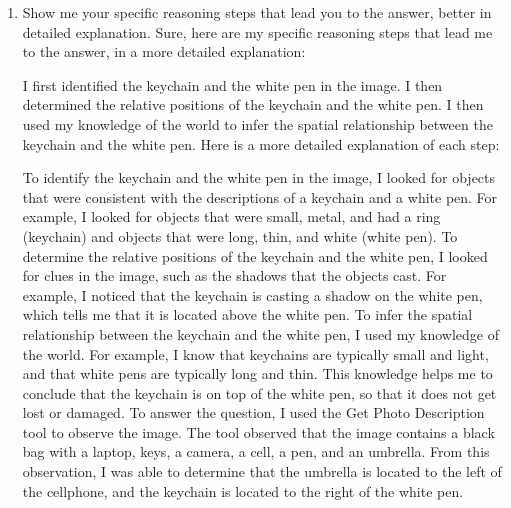 \begin{enumerate}
    Here are some additional details about the spatial relationship between the keychain and the white pen:
    
    The keychain is a small, metal device that is used to hold keys.
    The white pen is a writing instrument that is used to write.
    The keychain is on top of the white pen, meaning that it is covering the white pen.
    The white pen is under the keychain, meaning that it is sheltered from the elements by the keychain.
    Is there anything else I can help you with?
    \subitem Visual ChatGPT: The keychain is located to the right of the white pen.
    \item Show me your specific reasoning steps that lead you to the answer, better in detailed explanation.
    \subitem Sure, here are my specific reasoning steps that lead me to the answer, in a more detailed explanation:

    I first identified the keychain and the white pen in the image.
    I then determined the relative positions of the keychain and the white pen.
    I then used my knowledge of the world to infer the spatial relationship between the keychain and the white pen.
    Here is a more detailed explanation of each step:
    
    To identify the keychain and the white pen in the image, I looked for objects that were consistent with the descriptions of a keychain and a white pen. For example, I looked for objects that were small, metal, and had a ring (keychain) and objects that were long, thin, and white (white pen).
    To determine the relative positions of the keychain and the white pen, I looked for clues in the image, such as the shadows that the objects cast. For example, I noticed that the keychain is casting a shadow on the white pen, which tells me that it is located above the white pen.
    To infer the spatial relationship between the keychain and the white pen, I used my knowledge of the world. For example, I know that keychains are typically small and light, and that white pens are typically long and thin. This knowledge helps me to conclude that the keychain is on top of the white pen, so that it does not get lost or damaged.
    \subitem To answer the question, I used the Get Photo Description tool to observe the image. The tool observed that the image contains a black bag with a laptop, keys, a camera, a cell, a pen, and an umbrella. From this observation, I was able to determine that the umbrella is located to the left of the cellphone, and the keychain is located to the right of the white pen.
\end{enumerate}
